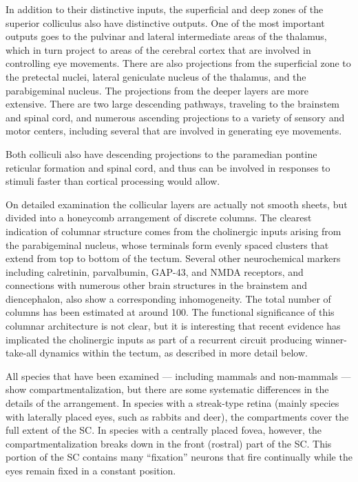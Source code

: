 \documentclass[]{book}
\begin{document}
In addition to their distinctive inputs, the superficial and deep zones of the superior colliculus also have distinctive outputs. One of the most important outputs goes to the pulvinar and lateral intermediate areas of the thalamus, which in turn project to areas of the cerebral cortex that are involved in controlling eye movements. There are also projections from the superficial zone to the pretectal nuclei, lateral geniculate nucleus of the thalamus, and the parabigeminal nucleus. The projections from the deeper layers are more extensive. There are two large descending pathways, traveling to the brainstem and spinal cord, and numerous ascending projections to a variety of sensory and motor centers, including several that are involved in generating eye movements.

Both colliculi also have descending projections to the paramedian pontine reticular formation and spinal cord, and thus can be involved in responses to stimuli faster than cortical processing would allow.

On detailed examination the collicular layers are actually not smooth sheets, but divided into a honeycomb arrangement of discrete columns. The clearest indication of columnar structure comes from the cholinergic inputs arising from the parabigeminal nucleus, whose terminals form evenly spaced clusters that extend from top to bottom of the tectum. Several other neurochemical markers including calretinin, parvalbumin, GAP-43, and NMDA receptors, and connections with numerous other brain structures in the brainstem and diencephalon, also show a corresponding inhomogeneity. The total number of columns has been estimated at around 100. The functional significance of this columnar architecture is not clear, but it is interesting that recent evidence has implicated the cholinergic inputs as part of a recurrent circuit producing winner-take-all dynamics within the tectum, as described in more detail below.

All species that have been examined --- including mammals and non-mammals --- show compartmentalization, but there are some systematic differences in the details of the arrangement. In species with a streak-type retina (mainly species with laterally placed eyes, such as rabbits and deer), the compartments cover the full extent of the SC. In species with a centrally placed fovea, however, the compartmentalization breaks down in the front (rostral) part of the SC. This portion of the SC contains many ``fixation'' neurons that fire continually while the eyes remain fixed in a constant position.
\end{document}
